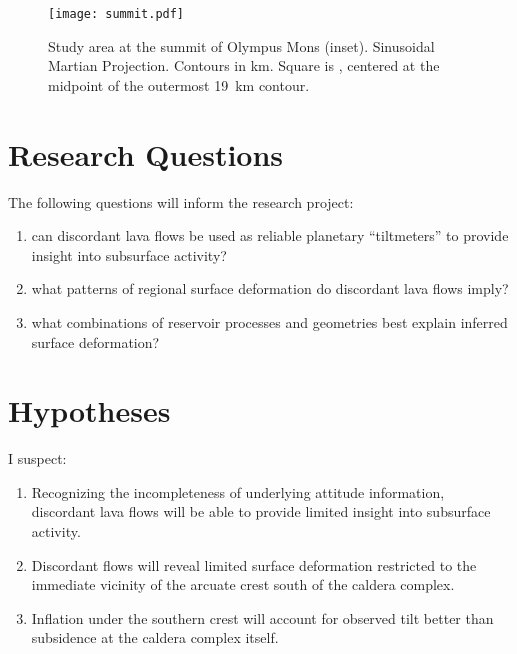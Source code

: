 \begin{figure}
    \centering
    \texttt{[image: summit.pdf]}
    \caption[Study area: Olympus Mons summit]{Study area at the summit of Olympus Mons (inset). Sinusoidal Martian Projection. Contours in \unit{km}. Square is , centered at the midpoint of the outermost \qty{19}{\km} contour.}\label{fig:summit}
\end{figure}

\section{Research Questions}

The following questions will inform the research project: 
\begin{enumerate}
    \item can discordant lava flows be used as reliable planetary ``tiltmeters'' to provide insight into subsurface activity?
    \item what patterns of regional surface deformation do discordant lava flows imply?
    \item what combinations of reservoir processes and geometries best explain inferred surface deformation?
\end{enumerate}

\section{Hypotheses}

I suspect:
\begin{enumerate}
    \item Recognizing the incompleteness of underlying attitude information, discordant lava flows will be able to provide limited insight into subsurface activity.
    \item Discordant flows will reveal limited surface deformation restricted to the immediate vicinity of the arcuate crest south of the caldera complex.
    \item Inflation under the southern crest will account for observed tilt better than subsidence at the caldera complex itself. 
\end{enumerate}

